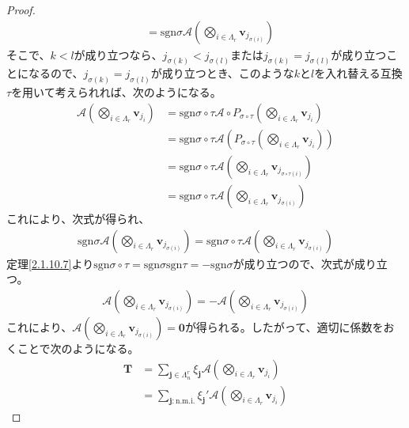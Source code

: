 \documentclass[dvipdfmx]{jsarticle}
\begin{document}
\begin{proof}
\begin{align*}
&= \mathrm{sgn}\sigma\mathcal{A}\left( \bigotimes_{i \in \varLambda_{r}} \mathbf{v}_{j_{\sigma(i)}} \right)
\end{align*}
そこで、$k < l$が成り立つなら、$j_{\sigma(k)} < j_{\sigma(l)}$または$j_{\sigma(k)} = j_{\sigma(l)}$が成り立つことになるので、$j_{\sigma(k)} = j_{\sigma(l)}$が成り立つとき、このような$k$と$l$を入れ替える互換$\tau$を用いて考えられれば、次のようになる。
\begin{align*}
\mathcal{A}\left( \bigotimes_{i \in \varLambda_{r}} \mathbf{v}_{j_{i}} \right) &= \mathrm{sgn}{\sigma \circ \tau}\mathcal{A \circ}P_{\sigma \circ \tau}\left( \bigotimes_{i \in \varLambda_{r}} \mathbf{v}_{j_{i}} \right)\\
&= \mathrm{sgn}{\sigma \circ \tau}\mathcal{A}\left( P_{\sigma \circ \tau}\left( \bigotimes_{i \in \varLambda_{r}} \mathbf{v}_{j_{i}} \right) \right)\\
&= \mathrm{sgn}{\sigma \circ \tau}\mathcal{A}\left( \bigotimes_{i \in \varLambda_{r}} \mathbf{v}_{j_{\sigma \circ \tau(i)}} \right)\\
&= \mathrm{sgn}{\sigma \circ \tau}\mathcal{A}\left( \bigotimes_{i \in \varLambda_{r}} \mathbf{v}_{j_{\sigma(i)}} \right)
\end{align*}
これにより、次式が得られ、
\begin{align*}
\mathrm{sgn}\sigma\mathcal{A}\left( \bigotimes_{i \in \varLambda_{r}} \mathbf{v}_{j_{\sigma(i)}} \right) = \mathrm{sgn}{\sigma \circ \tau}\mathcal{A}\left( \bigotimes_{i \in \varLambda_{r}} \mathbf{v}_{j_{\sigma(i)}} \right)
\end{align*}
定理\ref{2.1.10.7}より$\mathrm{sgn}{\sigma \circ \tau} = \mathrm{sgn}\sigma\mathrm{sgn}\tau = - \mathrm{sgn}\sigma$が成り立つので、次式が成り立つ。
\begin{align*}
\mathcal{A}\left( \bigotimes_{i \in \varLambda_{r}} \mathbf{v}_{j_{\sigma(i)}} \right) = \mathcal{- A}\left( \bigotimes_{i \in \varLambda_{r}} \mathbf{v}_{j_{\sigma(i)}} \right)
\end{align*}
これにより、$\mathcal{A}\left( \bigotimes_{i \in \varLambda_{r}} \mathbf{v}_{j_{\sigma(i)}} \right) = \mathbf{0}$が得られる。したがって、適切に係数をおくことで次のようになる。
\begin{align*}
\mathbf{T} &= \sum_{\mathbf{j} \in \varLambda_{n}^{r}} {\xi_{\mathbf{j}}\mathcal{A}\left( \bigotimes_{i \in \varLambda_{r}} \mathbf{v}_{j_{i}} \right)}\\
&= \sum_{\mathbf{j}:\mathrm{n.m.i.} } {\xi_{\mathbf{j}}'\mathcal{A}\left( \bigotimes_{i \in \varLambda_{r}} \mathbf{v}_{j_{i}} \right)}

\end{align*}
\end{proof}
\end{document}
